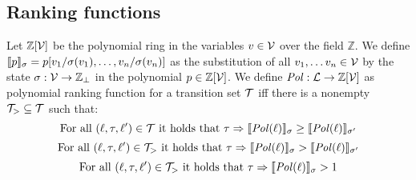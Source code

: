 \subsection{Ranking functions}

\begin{definition} 
	Let $\mathbb{Z}[\mathcal{V}]$ be the polynomial ring in the variables $v \in \mathcal{V}$ over the field $\mathbb{Z}$.
	We define $\llbracket p \rrbracket_{\sigma} = p[v_1/\sigma(v_1), \dots, v_n/\sigma(v_n)]$ as the substitution of all $v_1, \dots v_n \in \mathcal{V}$ by the state $\sigma: \mathcal{V} \rightarrow \mathbb{Z}_\bot$ in the polynomial $p \in \mathbb{Z}[\mathcal{V}]$.
	We define $\mathit{Pol}: \mathcal{L} \rightarrow \mathbb{Z}[\mathcal{V}]$ as polynomial ranking function for a transition set $\mathcal{T}$ iff there is a nonempty $\mathcal{T}_{>} \subseteq \mathcal{T}$ such that:
	\[ \text{For all } (\ell, \tau, \ell') \in \mathcal{T} \text{ it holds that } \tau \Rightarrow \llbracket \mathit{Pol}(\ell) \rrbracket_{\sigma} \geq \llbracket \mathit{Pol}(\ell) \rrbracket_{\sigma'} \]
	\[ \text{For all } (\ell, \tau, \ell') \in \mathcal{T}_{>} \text{ it holds that } \tau \Rightarrow \llbracket \mathit{Pol}(\ell) \rrbracket_{\sigma} > \llbracket \mathit{Pol}(\ell) \rrbracket_{\sigma'} \]
	\[ \text{For all } (\ell, \tau, \ell') \in \mathcal{T}_{>} \text{ it holds that } \tau \Rightarrow \llbracket \mathit{Pol}(\ell) \rrbracket_{\sigma} > 1 \]
\end{definition}
